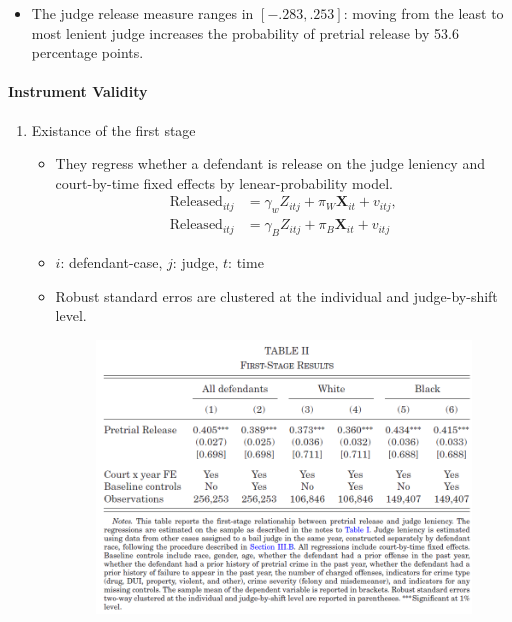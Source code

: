 \documentclass[../root]{subfiles}
\begin{document}
    \begin{itemize}
      \item The judge release measure ranges in $[-.283, .253]$: moving from the least to most lenient judge increases the probability of pretrial release by 53.6 percentage points.
    \end{itemize}

    \paragraph{Instrument Validity}
    \begin{enumerate}
      \item Existance of the first stage
      \begin{itemize}
        \item They regress whether a defendant is release on the judge leniency and court-by-time fixed effects by lenear-probability model.
        \begin{align*}
          \text{Released}_{itj} &= \gamma_w Z_{itj} + \pi_W \mathbf{X}_{it} + v_{itj}, \\
          \text{Released}_{itj} &= \gamma_B Z_{itj} + \pi_B \mathbf{X}_{it} + v_{itj}
        \end{align*}
        \item $i$: defendant-case, $j$: judge, $t$: time
        \item Robust standard erros are clustered at the individual and judge-by-shift level.
        \begin{figure}[h]
          \centering
          \includegraphics[scale = .8]{os0707tanji/ADY_T2}
        \end{figure}

\end{itemize}
\end{enumerate}
\end{document}

